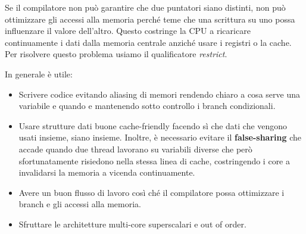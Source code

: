 Se il compilatore non può garantire che due puntatori siano distinti, non può ottimizzare gli accessi alla memoria perché teme che una scrittura su uno possa influenzare il valore dell'altro. Questo costringe la CPU a ricaricare continuamente i dati dalla memoria centrale anziché usare i registri o la cache. Per risolvere questo problema usiamo il qualificatore \textit{restrict}.

In generale è utile:
\begin{itemize}
    \item Scrivere codice evitando aliasing di memori rendendo chiaro a cosa serve una variabile e quando e mantenendo sotto controllo i branch condizionali.
    \item Usare strutture dati buone cache-friendly facendo sì che dati che vengono usati insieme, siano insieme. Inoltre, è necessario evitare il \textbf{false-sharing} che accade quando due thread lavorano su variabili diverse che però sfortunatamente risiedono nella stessa linea di cache, costringendo i core a invalidarsi la memoria a vicenda continuamente.
    \item Avere un buon flusso di lavoro così ché il compilatore possa ottimizzare i branch e gli accessi alla memoria.
    \item Sfruttare le architetture multi-core superscalari e out of order.
\end{itemize}